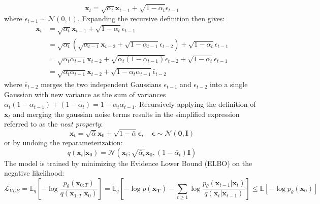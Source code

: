 \begin{equation}
    \mathbf{x}_t = \sqrt{\alpha_t} \mathbf{x}_{t-1} + \sqrt{1 - \alpha_t} \epsilon_{t-1}
\end{equation}
where $\epsilon_{t-1} \sim \mathcal{N}(0,1)$. Expanding the recursive definition then gives:
\begin{align}
    \mathbf{x}_t    & = \sqrt{\alpha_t} \mathbf{x}_{t-1} + \sqrt{1 - \alpha_t} \epsilon_{t-1} \\
                    & = \sqrt{\alpha_t} \left(
    \sqrt{\alpha_{t-1}} \mathbf{x}_{t-2} + \sqrt{1 - \alpha_{t-1}} \epsilon_{t-2}
    \right) + \sqrt{1 - \alpha_t} \epsilon_{t-1} \\
                    & = \sqrt{\alpha_t \alpha_{t-1}} \mathbf{x}_{t-2} + \sqrt{\alpha_t(1 - \alpha_{t-1})}\epsilon_{t-2} + \sqrt{1 - \alpha_{t}} \epsilon_{t-1} \\
                    & = \sqrt{\alpha_t \alpha_{t-1}} \mathbf{x}_{t-2} + \sqrt{1 - \alpha_{t}\alpha_{t-1}}\bar{\epsilon}_{t-2}
\end{align}
where $\bar{\epsilon}_{t-2}$ merges the two independent Gaussians $\epsilon_{t-1}$ and $\epsilon_{t-2}$ into a single Gaussian with new variance as the sum of variances $\alpha_t (1 - \alpha_{t-1}) + (1 - \alpha_{t}) = 1 - \alpha_t \alpha_{t-1}$. Recursively applying the definition of $\mathbf{x}_t$ and merging the gaussian noise terms results in the simplified expression referred to as the \textit{neat property}:
\begin{equation}
    \mathbf{x}_t = \sqrt{\bar{\alpha}}\mathbf{x}_0 + \sqrt{1 - \bar{\alpha}} \mathbf{\epsilon}, \quad \mathbf{\epsilon} \sim \mathcal{N}(\mathbf{0}, \mathbf{I})
\end{equation}
or by undoing the reparameterization:
\begin{equation}
    q(\mathbf{x}_t \vert \mathbf{x}_0) = \mathcal{N}(\mathbf{x}_t; \sqrt{\bar{\alpha}_t} \mathbf{x}_0, (1 - \bar{\alpha}_t)\mathbf{I})
\end{equation}
The model is trained by minimizing the Evidence Lower Bound (ELBO) on the negative likelihood:
\begin{equation}
    \mathcal{L}_{VLB}
        = \mathbb{E}_q\left[ - \log \frac{p_\theta(\mathbf{x}_{0:T})}{q(\mathbf{x}_{1:T} \vert \mathbf{x}_0)}\right]
        = \mathbb{E}_q\left[- \log p(\mathbf{x_T}) - \sum_{t \geq 1} \log \frac{p_\theta(\mathbf{x}_{t-1} \vert \mathbf{x}_{t})}{q(\mathbf{x}_t \vert \mathbf{x}_{t-1})}
        \right]
        \leq \mathbb{E}\left[- \log p_\theta(\mathbf{x}_0)\right]
\end{equation}
